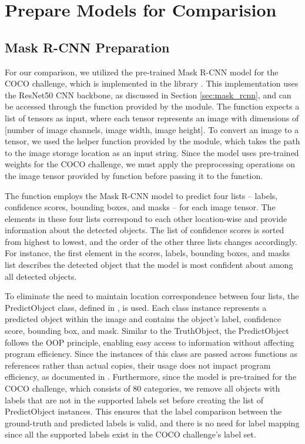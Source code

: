 \section{Prepare Models for Comparision}  \label{sec:prep_models}

\subsection{Mask R-CNN Preparation} \label{subsec:mrcnn_prep}

For our comparison, we utilized the pre-trained Mask R-CNN model for the COCO challenge, which is implemented in the  library \cite{pytorch_mrcnn}. This implementation uses the ResNet50 CNN backbone, as discussed in Section \ref{sec:mask_rcnn}, and can be accessed through the  function provided by the  module. The function expects a list of tensors as input, where each tensor represents an image with dimensions of [number of image channels, image width, image height]. To convert an image to a tensor, we used the  helper function provided by the  module, which takes the path to the image storage location as an input string. Since the model uses pre-trained weights for the COCO challenge, we must apply the preprocessing operations on the image tensor provided by  function before passing it to the  function.

The  function employs the Mask R-CNN model to predict four lists -- labels, confidence scores, bounding boxes, and masks -- for each image tensor. The elements in these four lists correspond to each other location-wise and provide information about the detected objects. The list of confidence scores is sorted from highest to lowest, and the order of the other three lists changes accordingly. For instance, the first element in the scores, labels, bounding boxes, and masks list describes the detected object that the model is most confident about among all detected objects. 

To eliminate the need to maintain location correspondence between four lists, the PredictObject class, defined in , is used. Each class instance represents a predicted object within the image and contains the object's label, confidence score, bounding box, and mask. Similar to the TruthObject, the PredictObject follows the OOP principle, enabling easy access to information without affecting program efficiency. Since the instances of this class are passed across functions as references rather than actual copies, their usage does not impact program efficiency, as documented in \cite{python3_docs}. Furthermore, since the model is pre-trained for the COCO challenge, which consists of 80 categories, we remove all objects with labels that are not in the supported labels set before creating the list of PredictObject instances. This ensures that the label comparison between the ground-truth and predicted labels is valid, and there is no need for label mapping since all the supported labels exist in the COCO challenge's label set.

